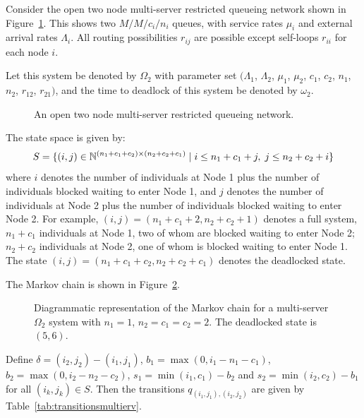 \documentclass{article}
\numberwithin{equation}{section}
\begin{document}
Consider the open two node multi-server restricted queueing network shown in
Figure~\ref{fig:queueingnetwork_2nodemulti}.
This shows two \(M/M/c_i/n_i\) queues, with service rates $\mu_i$ and external
arrival rates $\Lambda_i$.
All routing possibilities $r_{ij}$ are possible except self-loops $r_{ii}$ for
each node $i$.

Let this system be denoted by $\Omega_2$ with parameter set $(\Lambda_1$,
$\Lambda_2$, $\mu_1$, $\mu_2$, $c_1$, $c_2$, $n_1$, $n_2$, $r_{12}$, $r_{21})$,
and the time to deadlock of this system be denoted by $\omega_2$.

\begin{figure}[!htbp]
  \begin{center}
  
  \end{center}
  \caption{An open two node multi-server restricted queueing network.}
  \label{fig:queueingnetwork_2nodemulti}
\end{figure}

The state space is given by:
        \[S = \{(i,j)\in\mathbb{N}^{(n_1+c_1+c_2)\times (n_2+c_2+c_1)} \nonscript\; | \nonscript\; i \leq n_1+c_1+j, \nonscript\; j \leq n_2+c_2+i\}\]
where $i$ denotes the number of individuals at Node 1 plus the number of
individuals blocked waiting to enter Node 1, and $j$ denotes the number of
individuals at Node 2 plus the number of individuals blocked waiting to enter
Node 2.
For example, $(i, j) = (n_1+c_1+2, n_2+c_2+1)$ denotes a full system,
$n_1+c_1$ individuals at Node 1, two of whom are blocked waiting to enter
Node 2; $n_2+c_2$ individuals at Node 2, one of whom is blocked waiting to
enter Node 1.
The state $(i, j) = (n_1+c_1+c_2, n_2+c_2+c_1)$ denotes the deadlocked state.

The Markov chain is shown in Figure~\ref{fig:2nodeMCms}.

\begin{figure}[!htbp]
    
    \caption{Diagrammatic representation of the Markov chain for a
    multi-server $\Omega_2$ system with $n_1=1$, $n_2=c_1=c_2=2$.
    The deadlocked state is $(5,6)$.}
    \label{fig:2nodeMCms}
\end{figure}

Define $\delta = (i_2, j_2) - (i_1, j_1)$, $b_1 = \max(0, i_1-n_1-c_1)$,
$b_2 = \max(0, i_2-n_2-c_2)$, $s_1 = \min(i_1, c_1)-b_2$ and
$s_2 = \min(i_2, c_2)-b_1$ for all $(i_k, j_k) \in S$.
Then the transitions $q_{(i_1, j_1),(i_2, j_2)}$ are given by
Table~\ref{tab:transitionsmultierv}.
\end{document}
